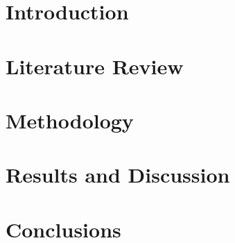 \documentclass{article}
\begin{document}
	
	\pagestyle{empty}
	
	\section{Introduction}
	
	\section{Literature Review}
	
	\section{Methodology}
	
	\section{Results and Discussion}
	
	\section{Conclusions}
	
\end{document}
